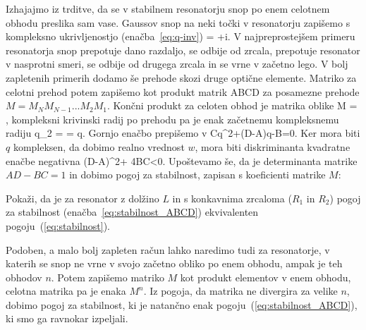 Izhajajmo iz trditve, da se v stabilnem resonatorju snop po enem celotnem obhodu
preslika sam vase. Gaussov snop na neki točki v resonatorju 
zapišemo s kompleksno ukrivljenostjo (enačba~\ref{eq:q-inv})
\beq
{}= +i.
\eeq
V najpreprostejšem primeru resonatorja snop prepotuje dano razdaljo, se odbije od zrcala, prepotuje
resonator v nasprotni smeri, se odbije od drugega zrcala in se vrne v začetno lego. V bolj 
zapletenih primerih dodamo še prehode skozi druge optične elemente. Matriko 
za celotni prehod potem zapišemo kot produkt matrik ABCD za posamezne prehode $M = M_N M_{N-1} ...M_2 M_1$.
Končni produkt za celoten obhod je matrika oblike
\beq
M = \left[\begin{array}{cc}
A & B\\
C & D
\end{array}\right],
\eeq
kompleksni krivinski radij po prehodu pa je enak začetnemu kompleksnemu radiju
\beq
q_2 =  = q.
\eeq
Gornjo enačbo prepišemo v 
\beq
Cq^2+(D-A)q-B=0.
\eeq
Ker mora biti $q$ kompleksen, da dobimo realno vrednost $w$, mora biti diskriminanta
kvadratne enačbe negativna
\beq
(D-A)^2+ 4BC<0.
\eeq
Upoštevamo še, da je determinanta matrike $AD-BC=1$ in dobimo pogoj za 
stabilnost, zapisan s koeficienti matrike $M$:

\begin{definition}
Pokaži, da je za resonator z dolžino $L$ in s konkavnima zrcaloma ($R_1$ in $R_2$) 
pogoj za stabilnost (enačba~\ref{eq:stabilnost_ABCD}) ekvivalenten pogoju~(\ref{eq:stabilnost}).
\end{definition}

Podoben, a malo bolj zapleten račun lahko naredimo tudi za resonatorje, v katerih se snop 
ne vrne v svojo začetno obliko po enem obhodu, ampak je teh obhodov $n$. Potem zapišemo
matriko $M$ kot produkt elementov v enem obhodu, celotna matrika pa je enaka $M^n$. Iz pogoja,
da matrika ne divergira za velike $n$, dobimo pogoj za stabilnost, ki je natančno 
enak pogoju~(\ref{eq:stabilnost_ABCD}), ki smo ga ravnokar izpeljali. 


